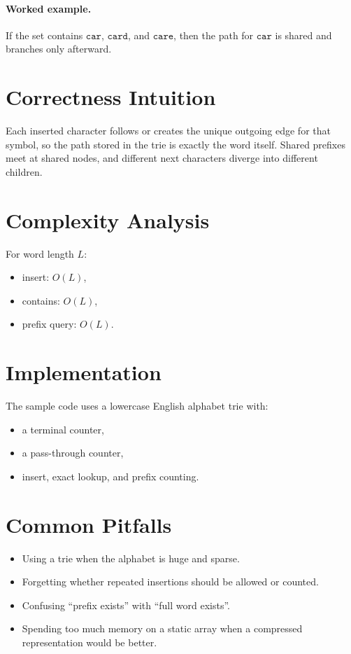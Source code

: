 \paragraph{Worked example.}
If the set contains \(\texttt{car}\), \(\texttt{card}\), and \(\texttt{care}\), then the path for \(\texttt{car}\) is
shared and branches only afterward.

\section*{Correctness Intuition}

Each inserted character follows or creates the unique outgoing edge for that symbol, so the path stored in the trie is
exactly the word itself. Shared prefixes meet at shared nodes, and different next characters diverge into different
children.

\section*{Complexity Analysis}

For word length \(L\):
\begin{itemize}
  \item insert: \(O(L)\),
  \item contains: \(O(L)\),
  \item prefix query: \(O(L)\).
\end{itemize}

\section*{Implementation}

The sample code uses a lowercase English alphabet trie with:

\begin{itemize}
  \item a terminal counter,
  \item a pass-through counter,
  \item insert, exact lookup, and prefix counting.
\end{itemize}

\section*{Common Pitfalls}

\begin{itemize}
  \item Using a trie when the alphabet is huge and sparse.
  \item Forgetting whether repeated insertions should be allowed or counted.
  \item Confusing ``prefix exists'' with ``full word exists''.
  \item Spending too much memory on a static array when a compressed representation would be better.
\end{itemize}

